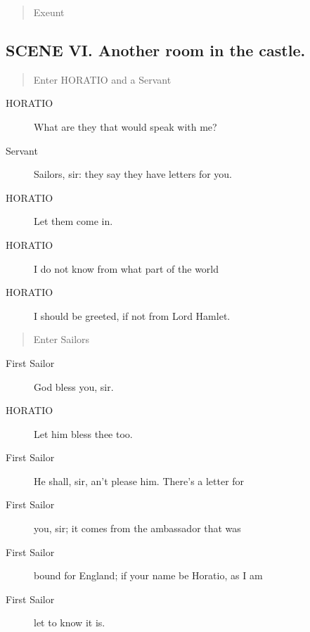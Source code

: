 \documentclass{article}
\begin{document}
\begin{quote}
Exeunt
\end{quote}
          
\subsection{SCENE VI.  Another room in the castle.}
          
\begin{quote}
Enter HORATIO and a Servant
\end{quote}
          
\begin{description}
            
\item[HORATIO] What are they that would speak with me?
\end{description}
          
\begin{description}
            
\item[Servant] Sailors, sir: they say they have letters for you.
\end{description}
          
\begin{description}
            
\item[HORATIO] Let them come in.
\item[HORATIO] I do not know from what part of the world
\item[HORATIO] I should be greeted, if not from Lord Hamlet.
\end{description}
          
\begin{quote}
Enter Sailors
\end{quote}
          
\begin{description}
            
\item[First Sailor] God bless you, sir.
\end{description}
          
\begin{description}
            
\item[HORATIO] Let him bless thee too.
\end{description}
          
\begin{description}
            
\item[First Sailor] He shall, sir, an't please him. There's a letter for
\item[First Sailor] you, sir; it comes from the ambassador that was
\item[First Sailor] bound for England; if your name be Horatio, as I am
\item[First Sailor] let to know it is.
\end{description}
          
\end{document}
